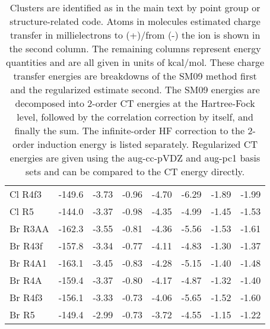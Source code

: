 \begin{table}
\begin{center}
\begin{tabular}{lrrrrrrr}
     Cl\sur{-} R4f3             &-149.6 & -3.73 & -0.96 & -4.70 & -6.29 & -1.89 & -1.99 \tabularnewline
     Cl\sur{-} R5               &-144.0 & -3.37 & -0.98 & -4.35 & -4.99 & -1.45 & -1.53 \tabularnewline  
     Br\sur{-} R3AA\sur{\prime} &-162.3 & -3.55 & -0.81 & -4.36 & -5.56 & -1.53 & -1.61 \tabularnewline
     Br\sur{-} R43f             &-157.8 & -3.34 & -0.77 & -4.11 & -4.83 & -1.30 & -1.37 \tabularnewline
     Br\sur{-} R4A1             &-163.1 & -3.45 & -0.83 & -4.28 & -5.15 & -1.40 & -1.48 \tabularnewline
     Br\sur{-} R4A              &-159.4 & -3.37 & -0.80 & -4.17 & -4.87 & -1.32 & -1.40 \tabularnewline   
     Br\sur{-} R4f3             &-156.1 & -3.33 & -0.73 & -4.06 & -5.65 & -1.52 & -1.60 \tabularnewline
     Br\sur{-} R5               &-149.4 & -2.99 & -0.73 & -3.72 & -4.55 & -1.15 & -1.22 \tabularnewline
    \hline 
    \hline
   \end{tabular}
  \end{center}
  \caption[Charge transfer and energies for ion/water clusters with \emph{n} = 5]{\label{tab:5_clusters} Clusters are identified as 
  in the main text by point group or structure-related code. Atoms in molecules
  estimated charge transfer in millielectrons to (+)/from (-) the ion is shown in the second column. The remaining columns represent energy
  quantities and are all given in units of kcal/mol. These charge transfer energies are breakdowns of the SM09 method first and the regularized
  estimate second. The SM09 energies are decomposed into 2-order CT energies at the Hartree-Fock level, followed by the correlation 
  correction by itself, and finally the sum. The infinite-order HF correction to the 2-order induction energy is listed separately.
  Regularized CT energies are given using the aug-cc-pVDZ and aug-pc1 basis sets and can be compared to the CT energy directly.}
 \end{table}

\restoregeometry
\newpage


